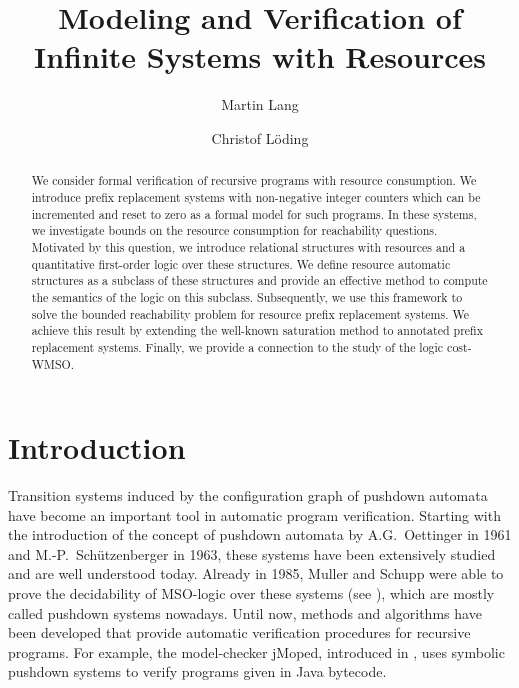 \documentclass{LMCS}
\begin{document}
\title{Modeling and Verification of Infinite Systems with Resources}

\author[M.~Lang]{Martin Lang}
\address{Chair of Computer Science 7, RWTH Aachen, 52056 Aachen (Germany)}


\author[C.~Löding]{Christof L{\"o}ding}


 
\begin{abstract}
  We consider formal verification of recursive programs with resource
consumption. We introduce prefix replacement systems with non-negative integer
counters which can be incremented and reset to zero as a formal model for such
programs. In these systems, we investigate bounds on the resource consumption
for reachability questions. Motivated by this question, we introduce relational
structures with resources and a quantitative first-order logic over these
structures. We define resource automatic structures as a subclass of these
structures and provide an effective method to compute the semantics of the logic
on this subclass. Subsequently, we use this framework to solve the bounded
reachability problem for resource prefix replacement systems. We achieve this 
result by extending the well-known saturation method to annotated prefix replacement
systems. Finally, we provide a connection to the study of the logic cost-WMSO.
\end{abstract}

\maketitle


\section{Introduction}

Transition systems induced by the configuration graph of pushdown automata have
become an important tool in automatic program verification. Starting with the
introduction of the concept of pushdown automata by A.G.\ Oettinger in 1961 and
M.-P.\ Sch\"{u}tzenberger in 1963, these systems have been extensively studied
and are well understood today. Already in 1985, Muller and Schupp were able to
prove the decidability of MSO-logic over these systems (see
\cite{theoryOfPushdownAutomata}), which are mostly called pushdown systems
nowadays. Until now, methods and algorithms have been developed that provide
automatic verification procedures for recursive programs. For example, the model-checker
jMoped, introduced in \cite{jMoped}, uses symbolic pushdown systems to verify
programs given in Java bytecode. 
\end{document}
